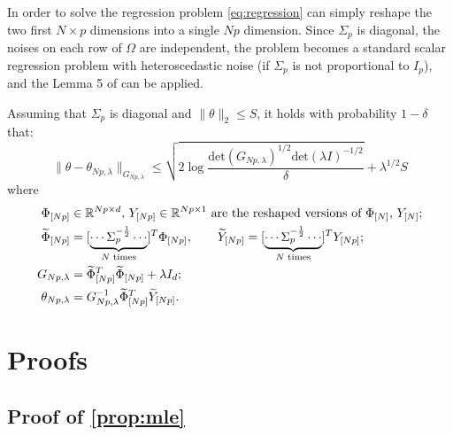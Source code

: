 \documentclass{article}
\begin{document}
In order to solve the regression problem \eqref{eq:regression} can simply reshape the two first $N\times p$ dimensions into a single $Np$ dimension. Since $\Sigma_p$ is diagonal, the noises on each row of $\Omega$ are independent, the problem becomes a standard scalar regression problem with heteroscedastic noise (if $\Sigma_p$ is not proportional to $I_p$), and the Lemma 5 of \citet{kirschner18heteroscedastic} can be applied.

\begin{lemma}
Assuming that $\Sigma_p$ is diagonal and $\|\theta\|_2\leq S$, it holds with probability $1-\delta$ that:
\begin{equation}
    \label{eq:confidence-ellipsoid}
    \|\theta - \theta_{Np,\lambda}\|_{G_{Np,\lambda}} \leq \sqrt{2\log \frac{\text{det}(G_{Np,\lambda})^{1/2}\text{det}(\lambda I)^{-1/2}}{\delta}} + \lambda^{1/2}S
\end{equation}
where
\begin{align*}
    \Phi_{[Np]}& \in\mathbb{R}^{Np\times d},\, Y_{[Np]}\in \mathbb{R}^{Np\times 1} \text{ are the reshaped versions of $\Phi_{[N]}$, $Y_{[N]}$};\\
    \widetilde{\Phi}_{[Np]} &= [\underbrace{\cdots \Sigma_p^{-\frac{1}{2}} \cdots}_{\text{$N$ times}}]^T \Phi_{[Np]} , \qquad  \widetilde{Y}_{[Np]} = [\underbrace{\cdots \Sigma_p^{-\frac{1}{2}} \cdots}_{\text{$N$ times}}]^TY_{[Np]};\\
    G_{Np, \lambda} &= \widetilde{\Phi}^T_{[Np]}\widetilde{\Phi}_{[Np]} + \lambda I_d;\\
    \theta_{Np,\lambda} &= G_{Np, \lambda}^{-1} \widetilde{\Phi}^T_{[Np]}\widetilde{Y}_{[Np]}.
\end{align*}
\end{lemma}



\section{Proofs}

\subsection{Proof of \autoref{prop:mle}}
\end{document}
